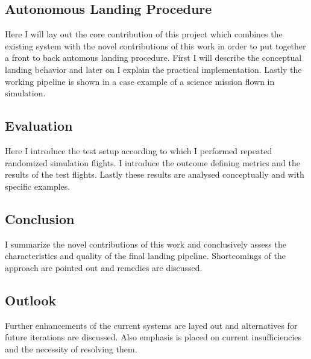 \subsection{Autonomous Landing Procedure}
Here I will lay out the core contribution of this project which combines the existing system with the novel contributions of this work in order to put together a front to back automous landing procedure. First I will describe the conceptual landing behavior and later on I explain the practical implementation. Lastly the working pipeline is shown in a case example of a science mission flown in simulation.
\subsection{Evaluation}
Here I introduce the test setup according to which I performed repeated randomized simulation flights. I introduce the outcome defining metrics and the results of the test flights. Lastly these results are analysed conceptually and with specific examples. %
\subsection{Conclusion}
I summarize the novel contributions of this work and conclusively assess the characteristics and quality of the final landing pipeline. Shortcomings of the approach are pointed out and remedies are discussed.
\subsection{Outlook}
Further enhancements of the current systems are layed out and alternatives for future iterations are discussed. Also emphasis is placed on current insufficiencies and the necessity of resolving them.